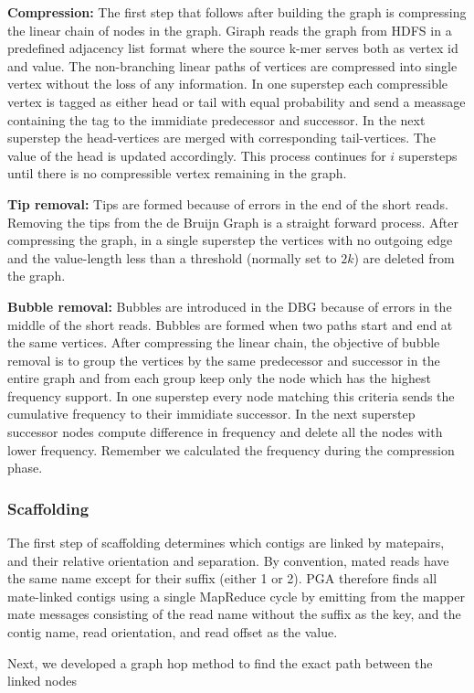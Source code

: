 \textbf{Compression:} The first step that follows after building the graph is compressing the linear chain of nodes in the graph.
Giraph reads the graph from HDFS in a predefined adjacency list format where the source k-mer serves both as vertex id and value.
The non-branching linear paths of vertices are compressed into single vertex without the loss of any information.
In one superstep each compressible vertex is tagged as either head or tail with equal probability and send a meassage containing the tag to the immidiate predecessor and successor.
In the next superstep the head-vertices are merged with corresponding tail-vertices.
The value of the head is updated accordingly. 
This process continues for $i$ supersteps until there is no compressible vertex remaining in the graph.

\textbf{Tip removal:} Tips are formed because of errors in the end of the short reads.
Removing the tips from the de Bruijn Graph is a straight forward process.
After compressing the graph, in a single superstep the vertices with no outgoing edge and the value-length less than a threshold (normally set to $2k$) are deleted from the graph.

\textbf{Bubble removal:} Bubbles are introduced in the DBG because of errors in the middle of the short reads.
Bubbles are formed when two paths start and end at the same vertices.
After compressing the linear chain, the objective of bubble removal is to group the vertices by the same predecessor and successor in the entire graph and from each group keep only the node which has the highest frequency support.
In one superstep every node matching this criteria sends the cumulative frequency to their immidiate successor.
In the next superstep successor nodes compute difference in frequency and delete all the nodes with lower frequency.
Remember we calculated the frequency during the compression phase.

\subsubsection {Scaffolding}
The first step of scaffolding determines which contigs are linked by matepairs, and their relative orientation and separation. By convention, mated reads have the same name except for their suffix (either 1 or 2). 
PGA therefore finds all mate-linked contigs using a single MapReduce cycle by emitting from the mapper mate messages consisting of the read name without the suffix as the key, and the contig name, read orientation, and read offset as the value.

Next, we developed a graph hop method to find the exact path between the linked nodes